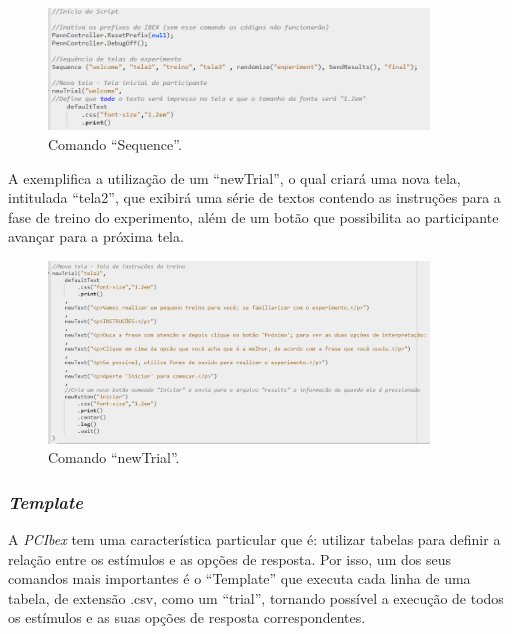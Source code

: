 \documentclass{textolivre}
\begin{document}
\begin{figure}[htbp]
 \centering
 \includegraphics[width=0.9\textwidth]{fig-009.png}
 \caption{Comando “Sequence”.}
 \label{fig9}
\end{figure}

A  exemplifica a utilização de um “newTrial”, o qual criará uma nova tela, intitulada “tela2”, que exibirá uma série de textos contendo as instruções para a fase de treino do experimento, além de um botão que possibilita ao participante avançar para a próxima tela.

\begin{figure}[htbp]
 \centering
 \includegraphics[width=0.9\textwidth]{fig-010.png}
 \caption{Comando “newTrial”.}
 \label{fig10}
\end{figure}

\subsubsection{\emph{Template}}
A \emph{PCIbex} tem uma característica particular que é: utilizar tabelas para definir a relação entre os estímulos e as opções de resposta. Por isso, um dos seus comandos mais importantes é o “Template” que executa cada linha de uma tabela, de extensão .csv, como um “trial”, tornando possível a execução de todos os estímulos e as suas opções de resposta correspondentes.
\end{document}
